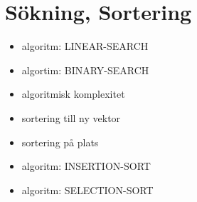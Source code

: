 \chapter{Sökning, Sortering}\label{chapter:W10}
\begin{multicols}{2}\begin{itemize}[nosep,label={$\square$}]
\item algoritm: LINEAR-SEARCH
\item algortim: BINARY-SEARCH
\item algoritmisk komplexitet
\item sortering till ny vektor
\item sortering på plats
\item algoritm: INSERTION-SORT
\item algoritm: SELECTION-SORT\end{itemize}\end{multicols}
